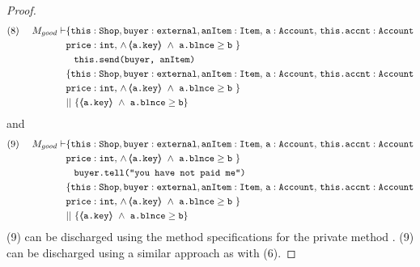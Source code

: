 \begin{proof}
\small
\begin{align*}
\text{(8)}  \ \ \ \ M_{good} \vdash &  \{  \prg{this}:\prg{Shop}, \prg{buyer} : \prg{external}, \prg{anItem} : \prg{Item},\, \prg{a}:\prg{Account},\, \prg{this.accnt}:\prg{Account}\\
				& \prg{price} : \prg{int},\,
				  \wedge\, 
				  \inside{\prg{a.key}}\ \wedge\ {\prg{a.blnce} \geq \prg{b}}\ \}\\
		  		&\;\;\; \prg{this.send(buyer, anItem)}\ \\  
		  		&  \{  \prg{this}:\prg{Shop}, \prg{buyer} : \prg{external}, \prg{anItem} : \prg{Item},\, \prg{a}:\prg{Account},\, \prg{this.accnt}:\prg{Account}\\
				& \prg{price} : \prg{int},\,
				  \wedge\, 
				  \inside{\prg{a.key}}\ \wedge\ {\prg{a.blnce} \geq \prg{b}}\ \}\\ 
				& || \  \{ \inside{\prg{a.key}}\ \wedge\ {\prg{a.blnce} \geq \prg{b}} \}
\end{align*}
\normalsize
and 
\small
\begin{align*}
\text{(9)}  \ \ \ \ M_{good} \vdash & \{  \prg{this}:\prg{Shop}, \prg{buyer} : \prg{external}, \prg{anItem} : \prg{Item},\, \prg{a}:\prg{Account},\, \prg{this.accnt}:\prg{Account}\\
				& \prg{price} : \prg{int},\,
				  \wedge\, 
				  \inside{\prg{a.key}}\ \wedge\ {\prg{a.blnce} \geq \prg{b}}\ \}\\
		  		&\;\;\; \prg{buyer.tell("you have not paid me")}\ \\  
		  		&  \{  \prg{this}:\prg{Shop}, \prg{buyer} : \prg{external}, \prg{anItem} : \prg{Item},\, \prg{a}:\prg{Account},\, \prg{this.accnt}:\prg{Account}\\
				& \prg{price} : \prg{int},\,
				  \wedge\, 
				  \inside{\prg{a.key}}\ \wedge\ {\prg{a.blnce} \geq \prg{b}}\ \}\\ 
				& || \  \{ \inside{\prg{a.key}}\ \wedge\ {\prg{a.blnce} \geq \prg{b}} \}
\end{align*}
\normalsize
(9) can be discharged using the method specifications for the private method . (9) can be discharged using a similar approach as with (6).


\end{proof}
